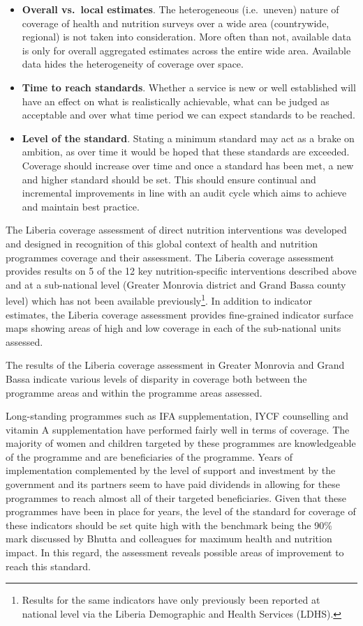 \documentclass[12pt,a4paper]{article}
\begin{document}
\begin{itemize}
\item
  \textbf{Overall vs.~local estimates}. The heterogeneous (i.e.~uneven) nature of coverage of health and nutrition surveys over a wide area (countrywide, regional) is not taken into consideration. More often than not, available data is only for overall aggregated estimates across the entire wide area. Available data hides the heterogeneity of coverage over space.
\item
  \textbf{Time to reach standards}. Whether a service is new or well established will have an effect on what is realistically achievable, what can be judged as acceptable and over what time period we can expect standards to be reached.
\item
  \textbf{Level of the standard}. Stating a minimum standard may act as a brake on ambition, as over time it would be hoped that these standards are exceeded. Coverage should increase over time and once a standard has been met, a new and higher standard should be set. This should ensure continual and incremental improvements in line with an audit cycle which aims to achieve and maintain best practice.
\end{itemize}

The Liberia coverage assessment of direct nutrition interventions was developed and designed in recognition of this global context of health and nutrition programmes coverage and their assessment. The Liberia coverage assessment provides results on 5 of the 12 key nutrition-specific interventions described above and at a sub-national level (Greater Monrovia district and Grand Bassa county level) which has not been available previously\footnote{Results for the same indicators have only previously been reported at national level via the Liberia Demographic and Health Services (LDHS).}. In addition to indicator estimates, the Liberia coverage assessment provides fine-grained indicator surface maps showing areas of high and low coverage in each of the sub-national units assessed.

The results of the Liberia coverage assessment in Greater Monrovia and Grand Bassa indicate various levels of disparity in coverage both between the programme areas and within the programme areas assessed.

Long-standing programmes such as IFA supplementation, IYCF counselling and vitamin A supplementation have performed fairly well in terms of coverage. The majority of women and children targeted by these programmes are knowledgeable of the programme and are beneficiaries of the programme. Years of implementation complemented by the level of support and investment by the government and its partners seem to have paid dividends in allowing for these programmes to reach almost all of their targeted beneficiaries. Given that these programmes have been in place for years, the level of the standard for coverage of these indicators should be set quite high with the benchmark being the 90\% mark discussed by Bhutta and colleagues \citep{Bhutta:2013ks} for maximum health and nutrition impact. In this regard, the assessment reveals possible areas of improvement to reach this standard.
\end{document}
